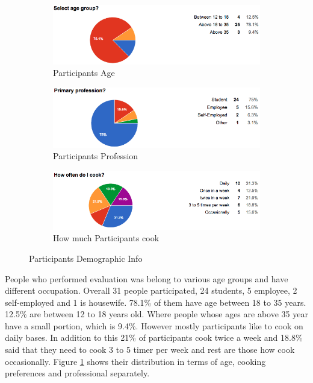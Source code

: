 	  \begin{figure}[h]
	  	\centering
	  	\begin{subfigure}{ .70\textwidth}
	  		\includegraphics[width= 1\linewidth]{figures/ch5_stat_age.png}
	  		\caption{Participants Age}
	  
	  			\end{subfigure}
	  
	  		\begin{subfigure}{.70\textwidth}
	  		\includegraphics[width= 1\linewidth]{figures/ch5_stat_profession.png}
	  		\caption{Participants Profession}
	  	\end{subfigure}
	  	\begin{subfigure}{.70\textwidth}
	  		\includegraphics[width= 1\linewidth]{figures/ch5_stat_cook.png}
	  		\caption{How much Participants cook}
	  	\end{subfigure}
	  	\caption{Participants Demographic Info}
	  	\label{fig:stat_demographic_info}
	  \end{figure}
	  
People who performed evaluation was belong to various age groups and have different occupation. Overall 31 people participated, 24 students, 5 employee, 2 self-employed and 1 is housewife. 78.1\% of them have age between 18 to 35 years.  12.5\% are between 12 to 18 years old. Where people whose ages are above 35 year have a small portion, which is 9.4\%. However mostly participants like to cook on daily bases. In addition to this 21\% of participants cook twice a week and 18.8\% said that they need to cook 3 to 5 timer per week and rest are those how cook occasionally. Figure \ref{fig:stat_demographic_info} shows their distribution in terms of age, cooking preferences and professional separately.


